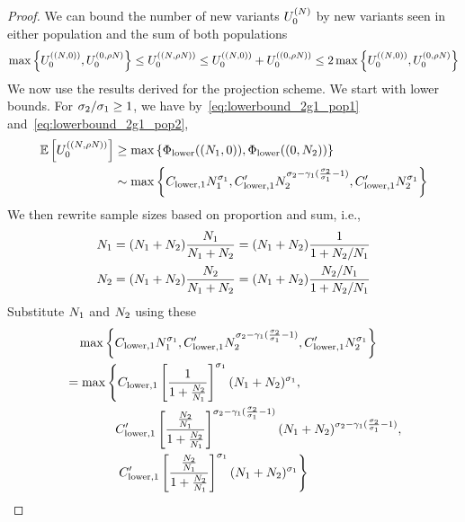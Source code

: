 \begin{proof}
We can bound the number of new variants $\news{\bm{0}}{\vecsamplesize}$ by new variants seen in either population and the sum of both populations
\begin{align*}
    \max\left\{\news{\bm{0}}{(\samplesize{},0)},\news{\bm{0}}{0, \propt\samplesize{}}\right\}\le \news{\bm{0}}{(\samplesize{}, \propt\samplesize{})}\le \news{\bm{0}}{(\samplesize{},0)}+\news{\bm{0}}{(0, \propt\samplesize{})}\le 2\max\left\{\news{\bm{0}}{(\samplesize{},0)},\news{\bm{0}}{0, \propt\samplesize{}}\right\}
\end{align*}
We now use the results derived for the projection scheme. We start with lower bounds. For $\sigma_{2}/\sigma_{1}\ge 1$, we have by~\cref{eq:lowerbound_2g1_pop1} and~\cref{eq:lowerbound_2g1_pop2},
\begin{align*}
    \E \left[\news{\bm{0}}{(\samplesize{}, \propt\samplesize{})}\right]& \ge\max\left\{\lowerbound((\samplesize{1},0)),\lowerbound((0,\samplesize{2}))\right\} \\
    &\sim \max\left\{\constantlower{1}\samplesize{1}^{\rate{1}}, \constantlowerwithotherrate{1}\samplesize{2}^{\rate{2}-\corr{1}(\frac{\rate{2}}{\rate{1}}-1)}, \constantlowerwithotherrate{1}\samplesize{2}^{\rate{1}}\right\} \\
\end{align*}
We then rewrite sample sizes based on proportion and sum, i.e., 
\begin{equation}
\begin{aligned}
    N_{1}&=(N_{1}+N_{2})\frac{N_{1}}{N_{1}+N_{2}}=(N_{1}+N_{2}) \frac{1}{1+N_{2}/N_{1}}\\
    N_{2}&=(N_{1}+N_{2})\frac{N_{2}}{N_{1}+N_{2}}=(N_{1}+N_{2})\frac{N_{2}/N_{1}}{1+N_{2}/N_{1}}
\end{aligned}
\label{eq:sample_size_change}
\end{equation}
Substitute $N_{1}$ and $N_{2}$ using these
\begin{align*}
    &~~~\max\left\{C_{\mathrm{lower},1}N_{1}^{\sigma_{1}}, C_{\mathrm{lower},1}'N_{2}^{\sigma_{2}-\gamma_{1}(\frac{\sigma_{2}}{\sigma_{1}}-1)}, C_{\mathrm{lower},1}'N_{2}^{\sigma_{1}}\right\}\\
    &=\max\left\{C_{\mathrm{lower},1}\left[\frac{1}{1+\frac{N_{2}}{N_{1}}}\right]^{\sigma_{1}}(N_{1}+N_{2})^{\sigma_{1}}, \right. \\
    &\qquad\qquad C_{\mathrm{lower},1}'\left[\frac{\frac{N_{2}}{N_{1}}}{1+\frac{N_{2}}{N_{1}}}\right]^{\sigma_{2}-\gamma_{1}(\frac{\sigma_{2}}{\sigma_{1}}-1)}(N_{1}+N_{2})^{\sigma_{2}-\gamma_{1}(\frac{\sigma_{2}}{\sigma_{1}}-1)}, \\
    & \qquad\qquad \left. C_{\mathrm{lower},1}'\left[\frac{\frac{N_{2}}{N_{1}}}{1+\frac{N_{2}}{N_{1}}}\right]^{\sigma_{1}}(N_{1}+N_{2})^{\sigma_{1}}\right\} \\
\end{align*}


\end{proof}
